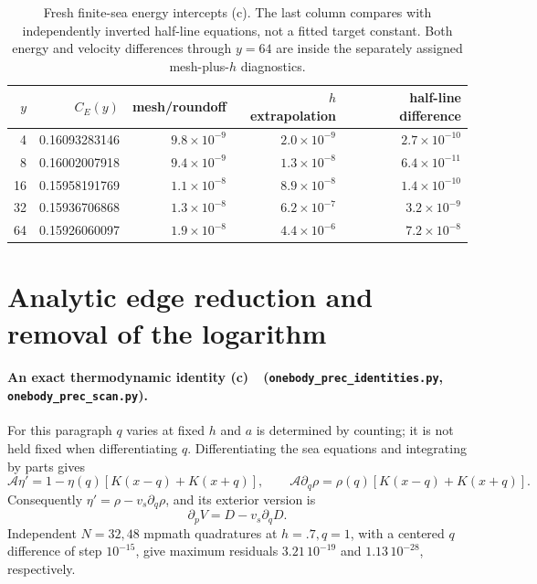\documentclass[11pt,a4paper]{article}
\newcommand{\Lc}{\textbf{(c)}\ }
\newcommand{\scan}{\texttt{onebody\_\allowbreak prec\_\allowbreak scan.py}}
\newcommand{\ids}{\texttt{onebody\_\allowbreak prec\_\allowbreak identities.py}}
\begin{document}
\begin{table}[ht]\centering\small
\begin{tabular}{rrrrr}\toprule
$y$ & $C_E(y)$ & mesh/roundoff & $h$ extrapolation & half-line difference\\\midrule
4 & 0.16093283146 & $9.8\times10^{-9}$ & $2.0\times10^{-9}$ & $2.7\times10^{-10}$ \\
8 & 0.16002007918 & $9.4\times10^{-9}$ & $1.3\times10^{-8}$ & $6.4\times10^{-11}$ \\
16 & 0.15958191769 & $1.1\times10^{-8}$ & $8.9\times10^{-8}$ & $1.4\times10^{-10}$ \\
32 & 0.15936706868 & $1.3\times10^{-8}$ & $6.2\times10^{-7}$ & $3.2\times10^{-9}$ \\
64 & 0.15926060097 & $1.9\times10^{-8}$ & $4.4\times10^{-6}$ & $7.2\times10^{-8}$ \\
\bottomrule\end{tabular}
\caption{Fresh finite-sea energy intercepts (c). The last column compares with independently inverted half-line equations, not a fitted target constant. Both energy and velocity differences through $y=64$ are inside the separately assigned mesh-plus-$h$ diagnostics.}
\end{table}

\section{Analytic edge reduction and removal of the logarithm}
\paragraph{An exact thermodynamic identity \Lc\ (\ids, \scan).}
For this paragraph $q$ varies at fixed $h$ and $a$ is determined by counting;
it is not held fixed when differentiating $q$. Differentiating the sea
equations and integrating by parts gives
\begin{equation}
 \mathcal A\eta'=1-\eta(q)[K(x-q)+K(x+q)],\qquad
 \mathcal A\partial_q\rho=\rho(q)[K(x-q)+K(x+q)].
\end{equation}
Consequently $\eta'=\rho-v_s\partial_q\rho$, and its exterior version is
\begin{equation}
 \boxed{\partial_pV=D-v_s\partial_qD.} \label{eq:identity}
\end{equation}
Independent $N=32,48$ mpmath quadratures at $h=.7,q=1$, with a centered
$q$ difference of step $10^{-15}$, give maximum residuals
$3.21\,10^{-19}$ and $1.13\,10^{-28}$, respectively.
\end{document}
